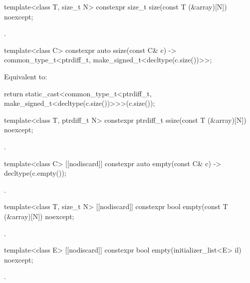 %
\begin{itemdecl}
template<class T, size_t N> constexpr size_t size(const T (&array)[N]) noexcept;
\end{itemdecl}
\begin{itemdescr}
\pnum
\returns
{}.
\end{itemdescr}

%
\begin{itemdecl}
template<class C> constexpr auto ssize(const C& c)
  -> common_type_t<ptrdiff_t, make_signed_t<decltype(c.size())>>;
\end{itemdecl}
\begin{itemdescr}
\pnum
\effects
Equivalent to:
\begin{codeblock}
return static_cast<common_type_t<ptrdiff_t, make_signed_t<decltype(c.size())>>>(c.size());
\end{codeblock}
\end{itemdescr}

%
\begin{itemdecl}
template<class T, ptrdiff_t N> constexpr ptrdiff_t ssize(const T (&array)[N]) noexcept;
\end{itemdecl}
\begin{itemdescr}
\pnum
\returns
{}.
\end{itemdescr}

%
\begin{itemdecl}
template<class C> [[nodiscard]] constexpr auto empty(const C& c) -> decltype(c.empty());
\end{itemdecl}
\begin{itemdescr}
\pnum
\returns
{}.
\end{itemdescr}

%
\begin{itemdecl}
template<class T, size_t N> [[nodiscard]] constexpr bool empty(const T (&array)[N]) noexcept;
\end{itemdecl}
\begin{itemdescr}
\pnum
\returns
{}.
\end{itemdescr}

%
\begin{itemdecl}
template<class E> [[nodiscard]] constexpr bool empty(initializer_list<E> il) noexcept;
\end{itemdecl}
\begin{itemdescr}
\pnum
\returns
{}.
\end{itemdescr}

